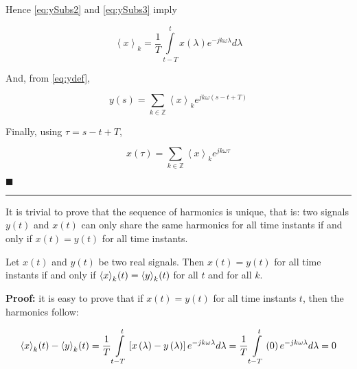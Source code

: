         Hence \eqref{eq:ySubs2} and \eqref{eq:ySubs3} imply

\begin{equation} \left\langle x \right\rangle_k = \dfrac{1}{T}\int\limits_{t-T}^{t}x\left(\lambda\right) e^{-jk\omega\lambda}d\lambda \end{equation}

        And, from \eqref{eq:ydef},

\begin{equation} y\left(s\right) = \sum\limits_{k\in\mathbb{Z}} \left\langle x \right\rangle_k e^{jk\omega\left(s - t + T\right)} \end{equation}

        Finally, using $\tau = s - t + T$,

\begin{equation} x\left(\tau\right) = \sum\limits_{k\in\mathbb{Z}} \left\langle x \right\rangle_k e^{jk\omega\tau} \end{equation}

\hfill$\blacksquare$

\vspace{5mm}
\hrule
\vspace{5mm}

	It is trivial to prove that the sequence of harmonics is unique, that is: two signals $y(t)$ and $x(t)$ can only share the same harmonics for all time instants if and only if $x(t)=y(t)$ for all time instants.

\begin{theorem}\label{theo:fdp_uniqueness}%
	Let $x(t)$ and $y(t)$ be two real signals. Then $x(t) = y(t)$ for all time instants if and only if $\left\langle x \right\rangle_k\hspace{-0.5mm} \left(t\right) = \left\langle y \right\rangle_k\hspace{-0.5mm} \left(t\right)$ for all $t$ and for all $k$. \end{theorem}
\textbf{Proof:} it is easy to prove that if $x(t) = y(t)$ for all time instants $t$, then the harmonics follow:

\begin{equation}
        \left\langle x \right\rangle_k\hspace{-0.5mm} \left(t\right) - \left\langle y \right\rangle_k\hspace{-0.5mm} \left(t\right) = \dfrac{1}{T}\int\limits_{t-T}^{t} \left[x\left(\lambda\right) - y\left(\lambda\right)\right]e^{-jk\omega\lambda}d\lambda = \dfrac{1}{T}\int\limits_{t-T}^{t} \left(0\right) e^{-jk\omega\lambda}d\lambda = 0
\end{equation}

